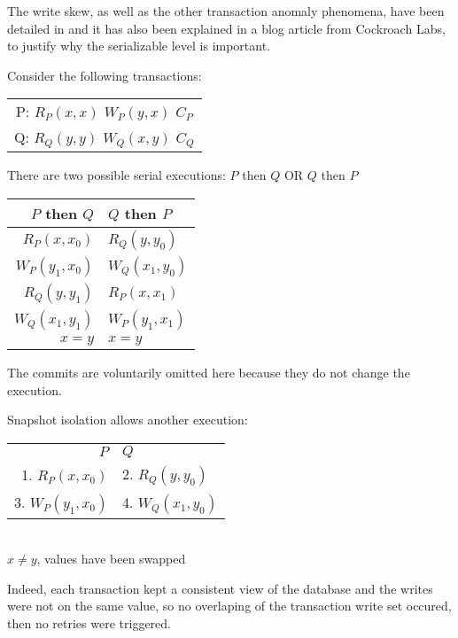 The write skew, as well as the other transaction anomaly phenomena, have been detailed in \cite{DBLP:journals/corr/abs-cs-0701157} and it has also been explained in a blog article from Cockroach Labs\cite{CRDB:write-skew}, to justify why the serializable level is important.



\iffalse


Consider the following transactions:
\begin{table}[H]
  \centering
  \begin{tabular}{ c }
    P:   $R_P(x, x)$ $W_P(y, x)$ $C_P$ \\
    Q:   $R_Q(y, y)$ $W_Q(x, y)$ $C_Q$ \\
  \end{tabular}
\end{table}


There are two possible serial executions: $P$ then $Q$ OR $Q$ then $P$

\begin{table}[H]
  \centering
  \begin{tabular}{ r | l }
    $P$ then $Q$ & $Q$ then $P$ \\
        \hline
    $R_P(x, x_0)$ &  $R_Q(y, y_0)$ \\
    $W_P(y_1, x_0)$ & $W_Q(x_1, y_0)$ \\
    $R_Q(y, y_1)$ &  $R_P(x, x_1)$ \\
    $W_Q(x_1, y_1)$ & $W_P(y_1, x_1)$ \\
    $x = y$ & $x = y$ \\
  \end{tabular}
\end{table}

The commits are voluntarily omitted here because they do not change the execution.

Snapshot isolation allows another execution:

\begin{table}[H]
  \centering
  \begin{tabular}{ r  l }
    $P$ & $Q$ \\
    1. $R_P(x, x_0)$ & 2. $R_Q(y, y_0)$ \\
    3. $W_P(y_1, x_0)$ & 4. $W_Q(x_1, y_0)$ \\
  \end{tabular}
  \\
  $x \neq y$, values have been swapped
\end{table}

Indeed, each transaction kept a consistent view of the database and the writes were not on the same value, so no overlaping of the transaction write set occured, then no retries were triggered.


